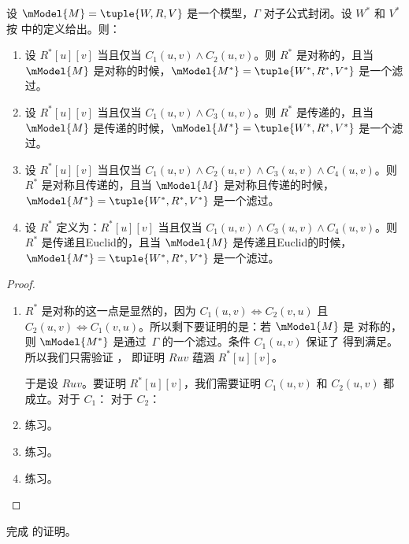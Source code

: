 \documentclass[../../../include/open-logic-section]{subfiles}
\begin{document}
\begin{thm}
  设 $\mModel{M} =\tuple{W,R,V}$ 是一个模型，$\Gamma$ 对子公式封闭。设 $W^*$ 和 $V^*$
  按  中的定义给出。则：
  \begin{enumerate}
  \item 设 $R^*[u][v]$ 当且仅当 $C_1(u, v) \land
    C_2(u,v)$。则 $R^*$ 是对称的，且当 $\mModel{M}$ 是对称的时候，$\mModel{M^*} =
    \tuple{W^*,R^*,V^*}$ 是一个滤过。
  \item 设 $R^*[u][v]$ 当且仅当 $C_1(u, v)
    \land C_3(u,v)$。则 $R^*$ 是传递的，且当 $\mModel{M}$
    是传递的时候，$\mModel{M^*}=\tuple{W^*,R^*,V^*}$ 是一个滤过。
  \item 设 $R^*[u][v]$ 当且仅当 $C_1(u, v) \land C_2(u,v)
    \land C_3(u,v) \land C_4(u,v)$。则 $R^*$ 是对称且传递的，且当 $\mModel{M}$
    是对称且传递的时候，$\mModel{M^*}=\tuple{W^*,R^*,V^*}$ 是一个滤过。
  \item 设 $R^*$ 定义为：$R^*[u][v]$ 当且仅当 $C_1(u,
    v) \land C_3(u,v) \land C_4(u,v)$。则 $R^*$ 是传递且Euclid的，且当 $\mModel{M}$
    是传递且Euclid的时候，$\mModel{M^*}=\tuple{W^*,R^*,V^*}$ 是一个滤过。
  \end{enumerate}
\end{thm}

\begin{proof}
  \begin{enumerate}
    \item $R^*$ 是对称的这一点是显然的，因为 $C_1(u,v)
      \Leftrightarrow C_2(v,u)$ 且 $C_2(u,v) \Leftrightarrow
      C_1(v,u)$。所以剩下要证明的是：若 $\mModel{M}$ 是
      对称的，则 $\mModel{M^*}$ 是通过~$\Gamma$ 的一个滤过。条件 $C_1(u,v)$ 保证了
      得到满足。所以我们只需验证
      ，
      即证明 $Ruv$ 蕴涵 $R^*[u][v]$。

      于是设 $Ruv$。要证明 $R^*[u][v]$，我们需要证明
      $C_1(u,v)$ 和 $C_2(u,v)$ 都成立。对于 $C_1$： 对于 $C_2$：
    \item 练习。
    \item 练习。
    \item 练习。
  \end{enumerate}
\end{proof}

\begin{prob}
  完成  的证明。
\end{prob}
\end{document}
